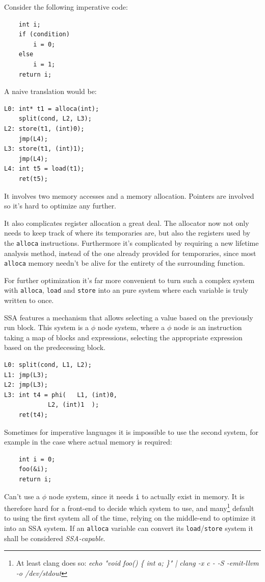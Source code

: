 \documentclass[12pt, a4paper]{article}
\begin{document}
Consider the following imperative code:

\begin{lstlisting}
	int i;
	if (condition)
		i = 0;
	else
		i = 1;
	return i;
\end{lstlisting}

A naive translation would be:

\begin{lstlisting}
L0:	int* t1 = alloca(int);
	split(cond, L2, L3);
L2:	store(t1, (int)0);
	jmp(L4);
L3:	store(t1, (int)1);
	jmp(L4);
L4:	int t5 = load(t1);
	ret(t5);
\end{lstlisting}

It involves two memory accesses and a memory allocation. Pointers are involved
so it's hard to optimize any further.

It also complicates register allocation a great deal. The allocator now not 
only needs to keep track of where its temporaries are, but also the registers 
used by the \verb+alloca+ instructions. Furthermore it's complicated by 
requiring a new lifetime analysis method, instead of the one already provided 
for temporaries, since most \verb+alloca+ memory needn't be alive for the 
entirety of the surrounding function.

For further optimization it's far more convenient to turn such a complex system
with \verb+alloca+, \verb+load+ and \verb+store+ into an pure system where each
variable is truly written to once.

SSA features a mechanism that allows selecting a value based on the previously 
run block. This system is a $\phi$ node system, where a $\phi$ node is an
instruction taking a map of blocks and expressions, selecting the appropriate
expression based on the predecessing block.

\begin{lstlisting}
L0:	split(cond, L1, L2);
L1:	jmp(L3);
L2:	jmp(L3);
L3:	int t4 = phi(	L1, (int)0,
			L2, (int)1	);
	ret(t4);
\end{lstlisting}

Sometimes for imperative languages it is impossible to use the second system, 
for example in the case where actual memory is required:

\begin{lstlisting}
	int i = 0;
	foo(&i);
	return i;
\end{lstlisting}

Can't use a $\phi$ node system, since it needs \verb+i+ to actually exist in 
memory. It is therefore hard for a front-end to decide which system to use, and 
many\footnote{At least clang does so: \textit{echo "void foo() \{ int a; \}" |
 clang -x c - -S -emit-llvm -o /dev/stdout}}
default to using the first system all of the time, relying on the 
middle-end to optimize it into an SSA system. If an \verb+alloca+ 
variable can convert its \verb+load+/\verb+store+ system it shall be considered 
\textit{SSA-capable}.
\end{document}
